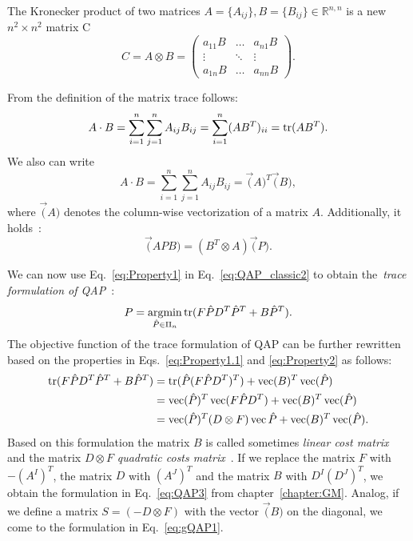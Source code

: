 The Kronecker  product of two matrices $A=\{A_{ij}\},B=\{B_{ij}\}\in\mathbb{R}^{n,n}$ is a new $n^2\times n^2$ matrix C
\begin{equation}\label{eq:kronecker}
C=A\otimes B =  	
\begin{pmatrix} a_{11}B & \dots & a_{n1}B \\ \vdots & \ddots & \vdots \\ a_{1n}B & \dots & a_{nn}B  \end{pmatrix}.
\end{equation}

From the definition of the matrix trace follows:
\begin{equation}\label{eq:Property1}
A\cdot B=\sum_{i=1}^{n}\sum_{j=1}^{n}A_{ij}B_{ij}=\sum_{i=1}^{n}(AB^T)_{ii}=\mathop{\rm tr}(AB^T).
\end{equation}
We also can write
\begin{equation}\label{eq:Property1.1}
A\cdot B=\sum_{i=1}^{n}\sum_{j=1}^{n}A_{ij}B_{ij}=\vec(A)^T\vec(B),
\end{equation}
where $\vec(A)$ denotes the column-wise vectorization of a matrix $A$. Additionally, it holds~\cite{Jain1989}:
\begin{equation}\label{eq:Property2}
\vec(APB)=(B^T\otimes A)\vec(P).
\end{equation}

We can now use Eq.~\eqref{eq:Property1} in Eq.~\eqref{eq:QAP_classic2} to obtain the~\emph{trace formulation of QAP}~\cite{Burkard98thequadratic}:
\begin{equation}\label{eq:QAP_classic3}
P = \mathop{\rm argmin}_{\hat{P}\in\Pi_n}\mathop{\rm tr}(F\hat{P}D^T\hat{P}^T+B\hat{P}^T).
\end{equation}
The objective function of the trace formulation of QAP can be further rewritten based on the properties in Eqs.~\eqref{eq:Property1.1} and \eqref{eq:Property2} as follows:
 \begin{align}\label{eq:QAP_classic4}
\mathop{\rm tr}(F\hat{P}D^T\hat{P}^T+B\hat{P}^T)&=\mathop{\rm tr}(\hat{P}(F\hat{P}D^T)^T)+\mathop{\rm vec}(B)^T\mathop{\rm vec}(\hat{P}) \notag\\	
									&=\mathop{\rm vec}(\hat{P})^T\mathop{\rm vec}(F\hat{P}D^T)+\mathop{\rm vec}(B)^T\mathop{\rm vec}(\hat{P}) \notag\\	
                                    &=\mathop{\rm vec}(\hat{P})^T(D\otimes F)\mathop{\rm vec}{\hat{P}}+\mathop{\rm vec}(B)^T\mathop{\rm vec}(\hat{P}).
\end{align}
Based on this formulation the matrix $B$ is called sometimes \emph{linear cost matrix} and the matrix $D\otimes F$ \emph{quadratic costs matrix}~\cite{Burkard98thequadratic,Roth2001}. If we replace the matrix $F$ with $-(A^I)^T$, the matrix $D$ with $(A^J)^T$ and the matrix $B$ with $D^I(D^J)^T$, we obtain the formulation in Eq.~\eqref{eq:QAP3} from chapter~\ref{chapter:GM}. Analog, if we define a matrix $S=(-D\otimes F)$ with the vector $\vec(B)$ on the diagonal, we come to the formulation in Eq.~\eqref{eq:gQAP1}.

